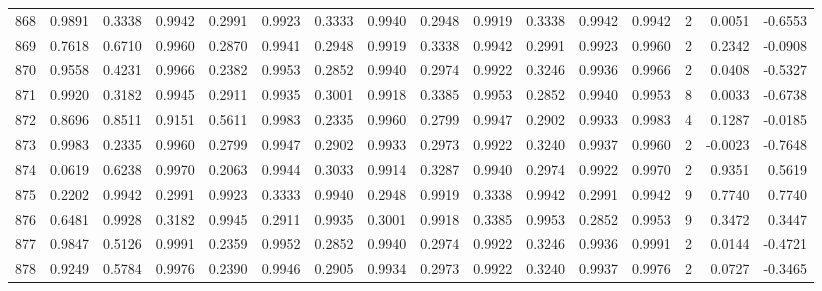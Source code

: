 \begin{tabular}{lrrrrrrrrrrrrrrr}
868 &      0.9891 &  0.3338 &  0.9942 &  0.2991 &  0.9923 &  0.3333 &  0.9940 &  0.2948 &  0.9919 &  0.3338 &   0.9942 &     0.9942 &      2 &                    0.0051 &                    -0.6553 \\
869 &      0.7618 &  0.6710 &  0.9960 &  0.2870 &  0.9941 &  0.2948 &  0.9919 &  0.3338 &  0.9942 &  0.2991 &   0.9923 &     0.9960 &      2 &                    0.2342 &                    -0.0908 \\
870 &      0.9558 &  0.4231 &  0.9966 &  0.2382 &  0.9953 &  0.2852 &  0.9940 &  0.2974 &  0.9922 &  0.3246 &   0.9936 &     0.9966 &      2 &                    0.0408 &                    -0.5327 \\
871 &      0.9920 &  0.3182 &  0.9945 &  0.2911 &  0.9935 &  0.3001 &  0.9918 &  0.3385 &  0.9953 &  0.2852 &   0.9940 &     0.9953 &      8 &                    0.0033 &                    -0.6738 \\
872 &      0.8696 &  0.8511 &  0.9151 &  0.5611 &  0.9983 &  0.2335 &  0.9960 &  0.2799 &  0.9947 &  0.2902 &   0.9933 &     0.9983 &      4 &                    0.1287 &                    -0.0185 \\
873 &      0.9983 &  0.2335 &  0.9960 &  0.2799 &  0.9947 &  0.2902 &  0.9933 &  0.2973 &  0.9922 &  0.3240 &   0.9937 &     0.9960 &      2 &                   -0.0023 &                    -0.7648 \\
874 &      0.0619 &  0.6238 &  0.9970 &  0.2063 &  0.9944 &  0.3033 &  0.9914 &  0.3287 &  0.9940 &  0.2974 &   0.9922 &     0.9970 &      2 &                    0.9351 &                     0.5619 \\
875 &      0.2202 &  0.9942 &  0.2991 &  0.9923 &  0.3333 &  0.9940 &  0.2948 &  0.9919 &  0.3338 &  0.9942 &   0.2991 &     0.9942 &      9 &                    0.7740 &                     0.7740 \\
876 &      0.6481 &  0.9928 &  0.3182 &  0.9945 &  0.2911 &  0.9935 &  0.3001 &  0.9918 &  0.3385 &  0.9953 &   0.2852 &     0.9953 &      9 &                    0.3472 &                     0.3447 \\
877 &      0.9847 &  0.5126 &  0.9991 &  0.2359 &  0.9952 &  0.2852 &  0.9940 &  0.2974 &  0.9922 &  0.3246 &   0.9936 &     0.9991 &      2 &                    0.0144 &                    -0.4721 \\
878 &      0.9249 &  0.5784 &  0.9976 &  0.2390 &  0.9946 &  0.2905 &  0.9934 &  0.2973 &  0.9922 &  0.3240 &   0.9937 &     0.9976 &      2 &                    0.0727 &                    -0.3465 \\

\end{tabular}

